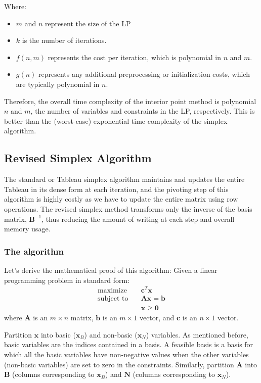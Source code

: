 Where:
\begin{itemize}
    \item $m$ and $n$ represent the size of the LP
    \item $k$ is the number of iterations.
    \item $f(n, m)$ represents the cost per iteration, which is polynomial in $n$ and $m$.
    \item $g(n)$ represents any additional preprocessing or initialization costs, which are typically polynomial in $n$.
\end{itemize}
Therefore, the overall time complexity of the interior point method is polynomial $n$ and $m$, the number of variables and constraints in the LP, respectively. This is better than the (worst-case) exponential time complexity of the simplex algorithm.

\subsection{Revised Simplex Algorithm}
The standard or Tableau simplex algorithm maintains and updates the entire Tableau in its
dense form at each iteration, and the pivoting step of this algorithm is highly costly as we have to update the entire matrix using row operations. The revised simplex method transforms only the inverse of the basis matrix, $\mathbf{B}^{-1}$, thus reducing the amount of writing at each step and overall memory usage.

\subsubsection{The algorithm}
Let's derive the mathematical proof of this algorithm:
Given a linear programming problem in standard form:
\begin{align*}
    \text{maximize} \quad   & \mathbf{c}^T \mathbf{x}           \\
    \text{subject to} \quad & \mathbf{A}\mathbf{x} = \mathbf{b} \\
                            & \mathbf{x} \geq \mathbf{0}
\end{align*}
where \(\mathbf{A} \) is an \( m \times n \) matrix,
\( \mathbf{b} \) is an \( m \times 1 \) vector, and
\( \mathbf{c} \) is an \( n \times 1 \) vector.


Partition \( \mathbf{x} \) into basic (\(\mathbf{x}_B \)) and non-basic (\( \mathbf{x}_N \)) variables.
As mentioned before, basic variables are the indices contained in a basis. A feasible basis is a basis for which
all the basic variables have non-negative values when the other variables (non-basic
variables) are set to zero in the constraints.
Similarly, partition \( \mathbf{A} \) into \( \mathbf{B} \) (columns corresponding to \( \mathbf{x}_B \))
and \( \mathbf{N} \) (columns corresponding to \( \mathbf{x}_N \)).

